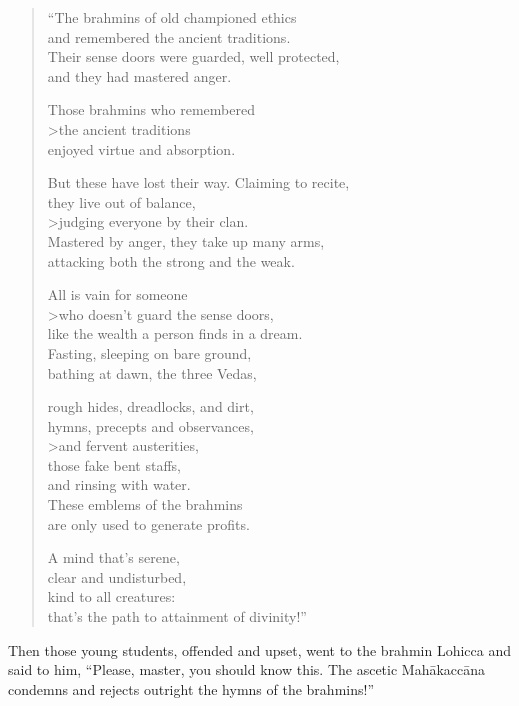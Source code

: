 \documentclass[12pt,openany]{book}%
\begin{document}
\begin{verse}%
“The brahmins of old championed ethics \\
and remembered the ancient traditions. \\
Their sense doors were guarded, well protected, \\
and they had mastered anger. 

Those brahmins who remembered \\>the ancient traditions \\
enjoyed virtue and absorption. 

But these have lost their way. Claiming to recite, \\
they live out of balance, \\>judging everyone by their clan. \\
Mastered by anger, they take up many arms, \\
attacking both the strong and the weak. 

All is vain for someone \\>who doesn’t guard the sense doors, \\
like the wealth a person finds in a dream. \\
Fasting, sleeping on bare ground, \\
bathing at dawn, the three Vedas, 

rough hides, dreadlocks, and dirt, \\
hymns, precepts and observances, \\>and fervent austerities, \\
those fake bent staffs, \\
and rinsing with water. \\
These emblems of the brahmins \\
are only used to generate profits. 

A mind that’s serene, \\
clear and undisturbed, \\
kind to all creatures: \\
that’s the path to attainment of divinity!” 

%
\end{verse}

Then those young students, offended and upset, went to the brahmin Lohicca and said to him, “Please, master, you should know this. The ascetic \textsanskrit{Mahākaccāna} condemns and rejects outright the hymns of the brahmins!” 
\end{document}
